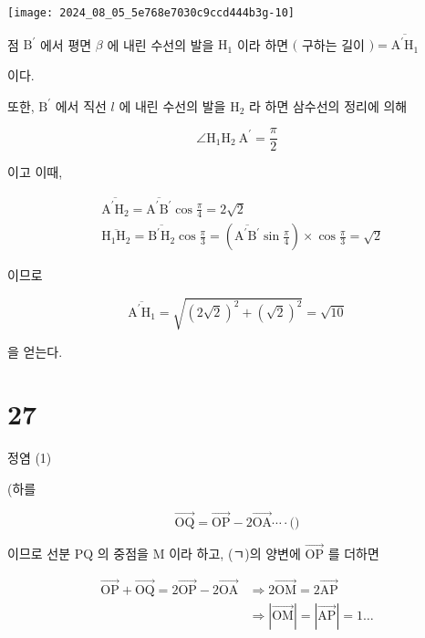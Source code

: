 \documentclass[10pt]{article}
\begin{document}
\begin{center}
\texttt{[image: 2024\_08\_05\_5e768e7030c9ccd444b3g-10]}
\end{center}

점 \(\mathrm{B}^{\prime}\) 에서 평면 \(\beta\) 에 내린 수선의 발을 \(\mathrm{H}_{1}\) 이라 하면 \((\) 구하는 길이 \()=\overline{\mathrm{A}^{\prime} \mathrm{H}_{1}}\)

이다.

또한, \(\mathrm{B}^{\prime}\) 에서 직선 \(l\) 에 내린 수선의 발을 \(\mathrm{H}_{2}\) 라 하면 삼수선의 정리에 의해

\[
\angle \mathrm{H}_{1} \mathrm{H}_{2} \mathrm{~A}^{\prime}=\frac{\pi}{2}
\]

이고 이때,

\[
\begin{aligned}
& \overline{\mathrm{A}^{\prime} \mathrm{H}_{2}}=\overline{\mathrm{A}^{\prime} \mathrm{B}^{\prime}} \cos \frac{\pi}{4}=2 \sqrt{2} \\
& \overline{\mathrm{H}_{1} \mathrm{H}_{2}}=\overline{\mathrm{B}^{\prime} \mathrm{H}_{2}} \cos \frac{\pi}{3}=\left(\overline{\mathrm{A}^{\prime} \mathrm{B}^{\prime}} \sin \frac{\pi}{4}\right) \times \cos \frac{\pi}{3}=\sqrt{2}
\end{aligned}
\]

이므로

\[
\overline{\mathrm{A}^{\prime} \mathrm{H}_{1}}=\sqrt{(2 \sqrt{2})^{2}+(\sqrt{2})^{2}}=\sqrt{10}
\]

을 얻는다.

\section*{27}
정염 (1)

(하를

\[
\overrightarrow{\mathrm{OQ}}=\overrightarrow{\mathrm{OP}}-2 \overrightarrow{\mathrm{OA}} \cdots \cdot(\mathcal{)}
\]

이므로 선분 PQ 의 중점을 M 이라 하고, (ㄱ)의 양변에 \(\overrightarrow{\mathrm{OP}}\) 를 더하면

\[
\begin{aligned}
\overrightarrow{\mathrm{OP}}+\overrightarrow{\mathrm{OQ}}=2 \overrightarrow{\mathrm{OP}}-2 \overrightarrow{\mathrm{OA}} & \Rightarrow 2 \overrightarrow{\mathrm{OM}}=2 \overrightarrow{\mathrm{AP}} \\
& \Rightarrow|\overrightarrow{\mathrm{OM}}|=|\overrightarrow{\mathrm{AP}}|=1 \ldots
\end{aligned}
\]
\end{document}

